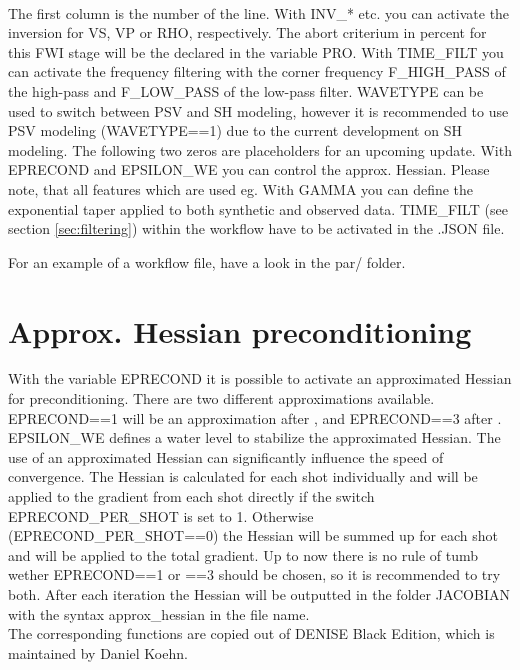 \ \\
The first column is the number of the line. With INV\_* etc. you can activate the inversion for VS, VP or RHO, respectively. The abort criterium in percent for this FWI stage will be the declared in the variable PRO. With TIME\_FILT you can activate the frequency filtering with the corner frequency F\_HIGH\_PASS of the high-pass and F\_LOW\_PASS of the low-pass filter. WAVETYPE can be used to switch between PSV and SH modeling, however it is recommended to use PSV modeling (WAVETYPE==1) due to the current development on SH modeling. The following two zeros are placeholders for an upcoming update. With EPRECOND and EPSILON\_WE you can control the approx. Hessian. Please note, that all features which are used eg.  With GAMMA you can define the exponential taper applied to both synthetic and observed data. TIME\_FILT (see section \ref{sec:filtering}) within the workflow have to be activated in the .JSON file.

For an example of a workflow file, have a look in the par/ folder.


\section{Approx. Hessian preconditioning}
{\color{blue}{\begin{verbatim}
			"EPRECOND" : "3",
			"EPSILON_WE" : "0.005",
			
			"EPRECOND_PER_SHOT" : "1",
\end{verbatim}}}
{\color{red}{\begin{verbatim}
Default values are:
			"EPRECOND" : "0",
\end{verbatim}}}

With the variable EPRECOND it is possible to activate an approximated Hessian for preconditioning. There are two different approximations available. EPRECOND==1 will be an approximation after \cite{shin2001efficient}, and EPRECOND==3 after \cite{plessix2004frequency}. EPSILON\_WE defines a water level to stabilize the approximated Hessian. The use of an approximated Hessian can significantly influence the speed of convergence. The Hessian is calculated for each shot individually and will be applied to the gradient from each shot directly if the switch EPRECOND\_PER\_SHOT is set to 1. Otherwise (EPRECOND\_PER\_SHOT==0) the Hessian will be summed up for each shot and will be applied to the total gradient. 
Up to now there is no rule of tumb wether EPRECOND==1 or ==3 should be chosen,  so it is recommended to try both. After each iteration the Hessian will be outputted in the folder JACOBIAN with the syntax \*approx\_hessian\* in the file name.\\
The corresponding functions are copied out of DENISE Black Edition, which is maintained by Daniel Koehn. 

